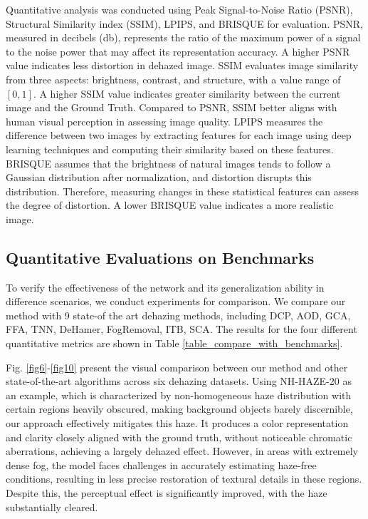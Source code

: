 \documentclass[lettersize,journal]{IEEEtran}
\begin{document}
 Quantitative analysis was conducted using Peak Signal-to-Noise Ratio (PSNR), Structural Similarity index (SSIM)\cite{wang2004image}, LPIPS\cite{zhang2018unreasonable}, and BRISQUE\cite{mittal2012no} for evaluation. PSNR, measured in decibels (db), represents the ratio of the maximum power of a signal to the noise power that may affect its representation accuracy. A higher PSNR value indicates less distortion in dehazed image. SSIM evaluates image similarity from three aspects: brightness, contrast, and structure, with a value range of $[0,1]$. A higher SSIM value indicates greater similarity between the current image and the Ground Truth. Compared to PSNR, SSIM better aligns with human visual perception in assessing image quality. LPIPS measures the difference between two images by extracting features for each image using deep learning techniques and computing their similarity based on these features. BRISQUE assumes that the brightness of natural images tends to follow a Gaussian distribution after normalization, and distortion disrupts this distribution. Therefore, measuring changes in these statistical features can assess the degree of distortion. A lower BRISQUE value indicates a more realistic image.
 
\subsection{Quantitative Evaluations on Benchmarks}
To verify the effectiveness of the network and its generalization ability in difference scenarios, we conduct experiments for comparison. We compare our method with 9 state-of the art dehazing methods, including DCP\cite{he2010single}, AOD\cite{li2017aod}, GCA\cite{chen2019gated}, FFA\cite{qin2020ffa}, TNN\cite{yu2021two}, DeHamer\cite{guo2022image}, FogRemoval\cite{jin2022structure}, ITB\cite{liu2023data}, SCA\cite{guo2023scanet}. The results for the four different quantitative metrics are shown in Table \ref{table_compare_with_benchmarks}.

Fig. \ref{fig6}-\ref{fig10} present the visual comparison between our method and other state-of-the-art algorithms across six dehazing datasets. Using NH-HAZE-20 as an example, which is characterized by non-homogeneous haze distribution with certain regions heavily obscured, making background objects barely discernible, our approach effectively mitigates this haze. It produces a color representation and clarity closely aligned with the ground truth, without noticeable chromatic aberrations, achieving a largely dehazed effect. However, in areas with extremely dense fog, the model faces challenges in accurately estimating haze-free conditions, resulting in less precise restoration of textural details in these regions. Despite this, the perceptual effect is significantly improved, with the haze substantially cleared.
\end{document}
